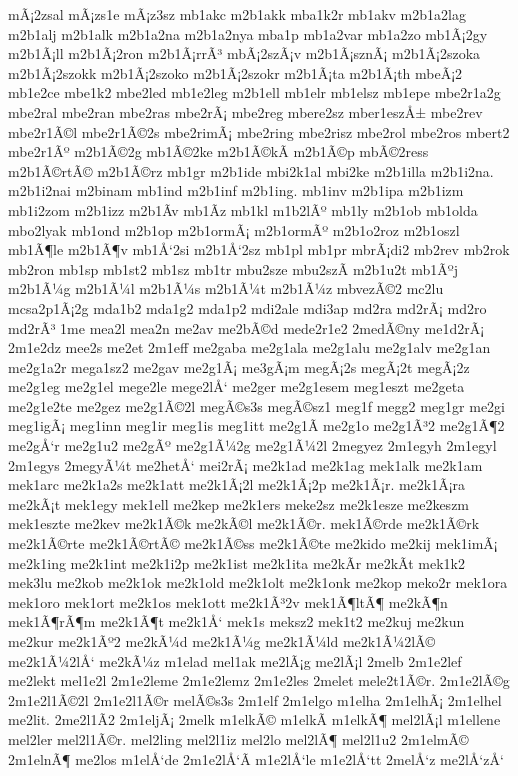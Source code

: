 {mÃ¡2zsal
mÃ¡zs1e
mÃ¡z3sz
mb1akc
m2b1akk
mba1k2r
mb1akv
m2b1a2lag
m2b1alj
m2b1alk
m2b1a2na
m2b1a2nya
mba1p
mb1a2var
mb1a2zo
mb1Ã¡2gy
m2b1Ã¡ll
m2b1Ã¡2ron
m2b1Ã¡rrÃ³
mbÃ¡2szÃ¡v
m2b1Ã¡sznÃ¡
m2b1Ã¡2szoka
m2b1Ã¡2szokk
m2b1Ã¡2szoko
m2b1Ã¡2szokr
m2b1Ã¡ta
m2b1Ã¡th
mbeÃ¡2
mb1e2ce
mbe1k2
mbe2led
mb1e2leg
m2b1ell
mb1elr
mb1elsz
mb1epe
mbe2r1a2g
mbe2ral
mbe2ran
mbe2ras
mbe2rÃ¡
mbe2reg
mbere2sz
mber1eszÅ±
mbe2rev
mbe2r1Ã©l
mbe2r1Ã©2s
mbe2rimÃ¡
mbe2ring
mbe2risz
mbe2rol
mbe2ros
mbert2
mbe2r1Ãº
m2b1Ã©2g
mb1Ã©2ke
m2b1Ã©kÃ­
m2b1Ã©p
mbÃ©2ress
m2b1Ã©rtÃ©
m2b1Ã©rz
mb1gr
m2b1ide
mbi2k1al
mbi2ke
m2b1illa
m2b1i2na.
m2b1i2nai
m2binam
mb1ind
m2b1inf
m2b1ing.
mb1inv
m2b1ipa
m2b1izm
mb1i2zom
m2b1izz
m2b1Ã­v
mb1Ã­z
mb1kl
m1b2lÃº
mb1ly
m2b1ob
mb1olda
mbo2lyak
mb1ond
m2b1op
m2b1ormÃ¡
m2b1ormÃº
m2b1o2roz
m2b1oszl
mb1Ã¶le
m2b1Ã¶v
mb1Å‘2si
m2b1Å‘2sz
mb1pl
mb1pr
mbrÃ¡di2
mb2rev
mb2rok
mb2ron
mb1sp
mb1st2
mb1sz
mb1tr
mbu2sze
mbu2szÃ­
m2b1u2t
mb1Ãºj
m2b1Ã¼g
m2b1Ã¼l
m2b1Ã¼s
m2b1Ã¼t
m2b1Ã¼z
mbvezÃ©2
mc2lu
mcsa2p1Ã¡2g
mda1b2
mda1g2
mda1p2
mdi2ale
mdi3ap
md2ra
md2rÃ¡
md2ro
md2rÃ³
1me
mea2l
mea2n
me2av
me2bÃ©d
mede2r1e2
2medÃ©ny
me1d2rÃ¡
2m1e2dz
mee2s
me2et
2m1eff
me2gaba
me2g1ala
me2g1alu
me2g1alv
me2g1an
me2g1a2r
mega1sz2
me2gav
me2g1Ã¡
me3gÃ¡m
megÃ¡2s
megÃ¡2t
megÃ¡2z
me2g1eg
me2g1el
mege2le
mege2lÅ‘
me2ger
me2g1esem
meg1eszt
me2geta
me2g1e2te
me2gez
me2g1Ã©2l
megÃ©s3s
megÃ©sz1
meg1f
megg2
meg1gr
me2gi
meg1igÃ¡
meg1inn
meg1ir
meg1is
meg1itt
me2g1Ã­
me2g1o
me2g1Ã³2
me2g1Ã¶2
me2gÅ‘r
me2g1u2
me2gÃº
me2g1Ã¼2g
me2g1Ã¼2l
2megyez
2m1egyh
2m1egyl
2m1egys
2megyÃ¼t
me2hetÅ‘
mei2rÃ¡
me2k1ad
me2k1ag
mek1alk
me2k1am
mek1arc
me2k1a2s
me2k1att
me2k1Ã¡2l
me2k1Ã¡2p
me2k1Ã¡r.
me2k1Ã¡ra
me2kÃ¡t
mek1egy
mek1ell
me2kep
me2k1ers
meke2sz
me2k1esze
me2keszm
mek1eszte
me2kev
me2k1Ã©k
me2kÃ©l
me2k1Ã©r.
mek1Ã©rde
me2k1Ã©rk
me2k1Ã©rte
me2k1Ã©rtÃ©
me2k1Ã©ss
me2k1Ã©te
me2kido
me2kij
mek1imÃ¡
me2k1ing
me2k1int
me2k1i2p
me2k1ist
me2k1ita
me2kÃ­r
me2kÃ­t
mek1k2
mek3lu
me2kob
me2k1ok
me2k1old
me2k1olt
me2k1onk
me2kop
meko2r
mek1ora
mek1oro
mek1ort
me2k1os
mek1ott
me2k1Ã³2v
mek1Ã¶ltÃ¶
me2kÃ¶n
mek1Ã¶rÃ¶m
me2k1Ã¶t
me2k1Å‘
mek1s
meksz2
mek1t2
me2kuj
me2kun
me2kur
me2k1Ãº2
me2kÃ¼d
me2k1Ã¼g
me2k1Ã¼ld
me2k1Ã¼2lÃ©
me2k1Ã¼2lÅ‘
me2kÃ¼z
m1elad
mel1ak
me2lÃ¡g
me2lÃ¡l
2melb
2m1e2lef
me2lekt
mel1e2l
2m1e2leme
2m1e2lemz
2m1e2les
2melet
mele2t1Ã©r.
2m1e2lÃ©g
2m1e2l1Ã©2l
2m1e2l1Ã©r
melÃ©s3s
2m1elf
2m1elgo
m1elha
2m1elhÃ¡
2m1elhel
me2lit.
2me2l1Ã­2
2m1eljÃ¡
2melk
m1elkÃ©
m1elkÃ­
m1elkÃ¶
mel2lÃ¡l
m1ellene
mel2ler
mel2l1Ã©r.
mel2ling
mel2l1iz
mel2lo
mel2lÃ¶
mel2l1u2
2m1elmÃ©
2m1elnÃ¶
me2los
m1elÅ‘de
2m1e2lÅ‘Ã­
m1e2lÅ‘le
m1e2lÅ‘tt
2melÅ‘z
me2lÅ‘zÅ‘
}

